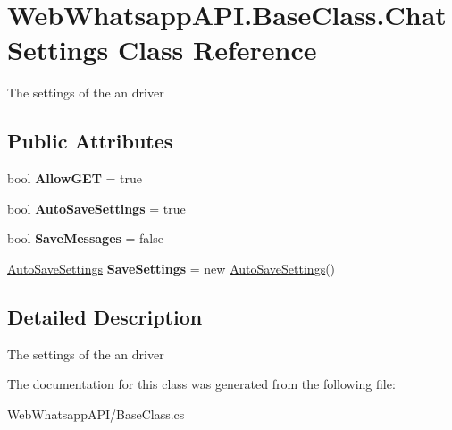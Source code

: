 \hypertarget{class_web_whatsapp_a_p_i_1_1_base_class_1_1_chat_settings}{}\section{Web\+Whatsapp\+A\+P\+I.\+Base\+Class.\+Chat\+Settings Class Reference}
\label{class_web_whatsapp_a_p_i_1_1_base_class_1_1_chat_settings}


The settings of the an driver  


\subsection*{Public Attributes}
\begin{DoxyCompactItemize}
\item 
\mbox{\label{class_web_whatsapp_a_p_i_1_1_base_class_1_1_chat_settings_ae5a3f25d99ac2fe65071e6ce7ded3a42}} 
bool {\bfseries Allow\+G\+ET} = true
\item 
\mbox{\label{class_web_whatsapp_a_p_i_1_1_base_class_1_1_chat_settings_aedbc99082538d5a61c653caa7e336e1c}} 
bool {\bfseries Auto\+Save\+Settings} = true
\item 
\mbox{\label{class_web_whatsapp_a_p_i_1_1_base_class_1_1_chat_settings_a0cbc84fe0f8fae01e324a6184c31dd65}} 
bool {\bfseries Save\+Messages} = false
\item 
\mbox{\label{class_web_whatsapp_a_p_i_1_1_base_class_1_1_chat_settings_ae56212dc2d8c5532b446368ddc828b92}} 
\hyperlink{class_web_whatsapp_a_p_i_1_1_base_class_1_1_auto_save_settings}{Auto\+Save\+Settings} {\bfseries Save\+Settings} = new \hyperlink{class_web_whatsapp_a_p_i_1_1_base_class_1_1_auto_save_settings}{Auto\+Save\+Settings}()
\end{DoxyCompactItemize}


\subsection{Detailed Description}
The settings of the an driver 



The documentation for this class was generated from the following file\+:\begin{DoxyCompactItemize}
\item 
Web\+Whatsapp\+A\+P\+I/Base\+Class.\+cs\end{DoxyCompactItemize}
